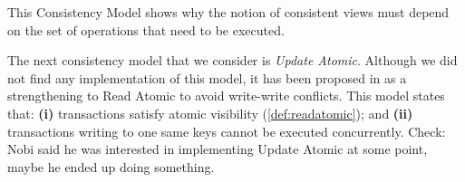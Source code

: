 






\ac{This Consistency Model shows why the notion of consistent views must 
depend on the set of operations that need to be executed.}

The next consistency model that we consider is \emph{Update Atomic}. 
Although we did not find any implementation of this model, it has been proposed in \cite{framework-concur} as a strengthening to Read Atomic to avoid write-write conflicts.
This model states that: \textbf{(i)} transactions satisfy atomic visibility (\cref{def:readatomic}); and \textbf{(ii)} transactions writing to one same keys cannot be executed concurrently.
\ac{Check: Nobi said he was interested in implementing Update Atomic 
at some point, maybe he ended up doing something.}

